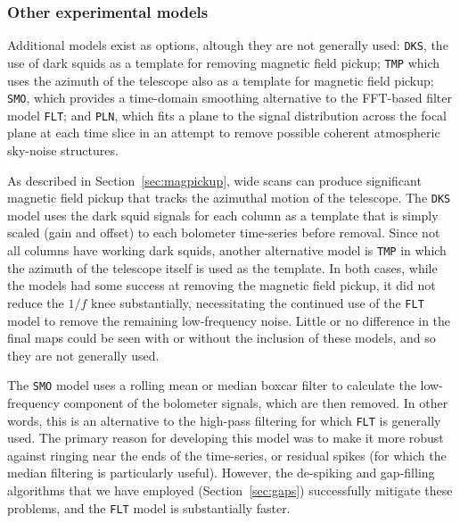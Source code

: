 \documentclass[useAMS,usenatbib,nofootinbib]{mn2e}
\newcommand{\model}[1]{\texttt{#1}}
\begin{document}
\subsubsection{Other experimental models}

Additional models exist as options, altough they are not generally
used: \model{DKS}, the use of dark squids as a template for removing
magnetic field pickup; \model{TMP} which uses the azimuth of the
telescope also as a template for magnetic field pickup; \model{SMO},
which provides a time-domain smoothing alternative to the FFT-based
filter model \model{FLT}; and \model{PLN}, which fits a plane to the
signal distribution across the focal plane at each time slice in an
attempt to remove possible coherent atmospheric sky-noise structures.

As described in Section~\ref{sec:magpickup}, wide scans can produce
significant magnetic field pickup that tracks the azimuthal motion of
the telescope. The \model{DKS} model uses the dark squid signals for
each column as a template that is simply scaled (gain and offset) to
each bolometer time-series before removal. Since not all columns have
working dark squids, another alternative model is \model{TMP} in which
the azimuth of the telescope itself is used as the template. In both
cases, while the models had some success at removing the magnetic
field pickup, it did not reduce the $1/f$ knee substantially,
necessitating the continued use of the \model{FLT} model to remove the
remaining low-frequency noise. Little or no difference in the final
maps could be seen with or without the inclusion of these models, and
so they are not generally used.

The \model{SMO} model uses a rolling mean or median boxcar filter to
calculate the low-frequency component of the bolometer signals, which
are then removed. In other words, this is an alternative to the
high-pass filtering for which \model{FLT} is generally used. The
primary reason for developing this model was to make it more robust
against ringing near the ends of the time-series, or residual spikes
(for which the median filtering is particularly useful). However, the
de-spiking and gap-filling algorithms that we have employed
(Section~\ref{sec:gaps}) successfully mitigate these problems, and the
\model{FLT} model is substantially faster.
\end{document}

